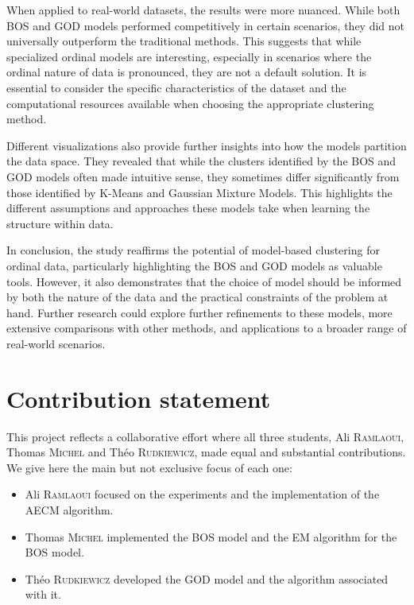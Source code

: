 When applied to real-world datasets, the results were more nuanced. While both BOS and GOD models performed competitively in certain scenarios, they did not universally outperform the traditional methods. This suggests that while specialized ordinal models are interesting, especially in scenarios where the ordinal nature of data is pronounced, they are not a default solution. It is essential to consider the specific characteristics of the dataset and the computational resources available when choosing the appropriate clustering method.

Different visualizations also provide further insights into how the models partition the data space. They revealed that while the clusters identified by the BOS and GOD models often made intuitive sense, they sometimes differ significantly from those identified by K-Means and Gaussian Mixture Models. This highlights the different assumptions and approaches these models take when learning the structure within data.

In conclusion, the study reaffirms the potential of model-based clustering for ordinal data, particularly highlighting the BOS and GOD models as valuable tools. However, it also demonstrates that the choice of model should be informed by both the nature of the data and the practical constraints of the problem at hand. Further research could explore further refinements to these models, more extensive comparisons with other methods, and applications to a broader range of real-world scenarios.

\section{Contribution statement}
This project reflects a collaborative effort where all three students, Ali \textsc{Ramlaoui}, Thomas \textsc{Michel} and Théo \textsc{Rudkiewicz}, made equal and substantial contributions. 
We give here the main but not exclusive focus of each one:
\begin{itemize}
    \item Ali \textsc{Ramlaoui} focused on the experiments and the implementation of the AECM algorithm.
    \item Thomas \textsc{Michel} implemented the BOS model and the EM algorithm for the BOS model.
    \item Théo \textsc{Rudkiewicz} developed the GOD model and the algorithm associated with it.
\end{itemize}



